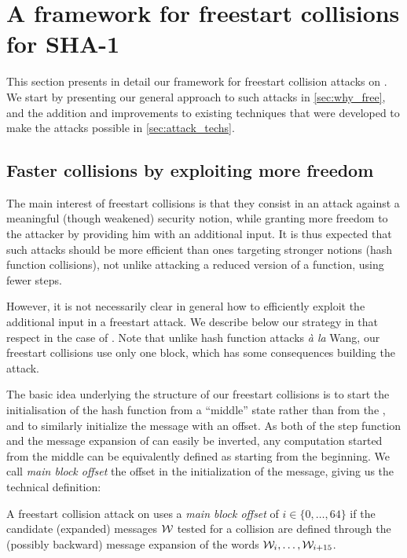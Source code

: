 \section{A framework for freestart collisions for SHA-1}
\label{sec:framework}
This section presents in detail our framework for freestart collision attacks on \shaone. We start by presenting our general approach to such attacks
in \autoref{sec:why_free}, and the addition and improvements to existing techniques that were developed to make the attacks possible in \autoref{sec:attack_techs}.

\subsection{Faster collisions by exploiting more freedom}
\label{sec:why_free}

The main interest of freestart collisions is that they consist in an attack against a meaningful (though weakened) security notion, while granting more freedom to
the attacker by providing him with an additional input. It is thus expected that such attacks should be more efficient than ones targeting stronger notions (\eg hash function
collisions), not unlike attacking a reduced version of a function, using fewer steps.

However, it is not necessarily clear in general how to efficiently exploit the additional input in a freestart attack. We describe below our strategy in that respect
in the case of \shaone. Note that unlike hash function attacks \emph{à la} Wang, our freestart collisions use only one block, which has some consequences building
the attack.

\medskip

The basic idea underlying the structure of our freestart collisions is to start the initialisation of the hash function from a ``middle'' state rather than from the \iv,
and to similarly initialize the message with an offset. As both of the step function and the message expansion of \shaone can easily be inverted, any computation started
from the middle can be equivalently defined as starting from the beginning. We call \emph{main block offset} the offset in the initialization of the message, giving us
the technical definition:

\begin{defi}
A freestart collision attack on \shaone uses a \emph{main block offset} of $i \in \{0, \ldots, 64\}$ if the candidate (expanded) messages $\mathcal{W}$ tested for a collision are defined
through the (possibly backward) message expansion of the words $\mathcal{W}_i, \ldots, \mathcal{W}_{i + 15}$.
\end{defi}

